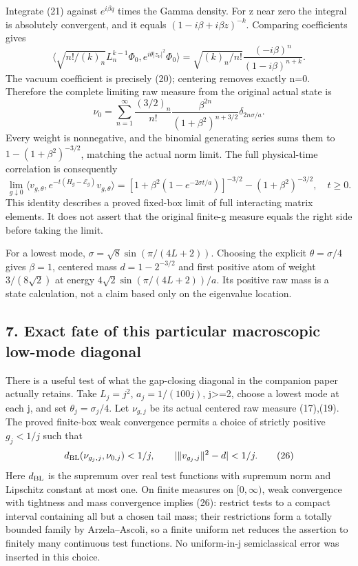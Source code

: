 \documentclass[
  11pt,
]{article}
\begin{document}
Integrate (21) against \(e^{i\beta q}\) times the Gamma density. For z
near zero the integral is absolutely convergent, and it equals
\((1-i\beta+i\beta z)^{-k}\). Comparing coefficients gives \[
 \langle \sqrt{n!/(k)_n}L_n^{k-1}\Phi_0,
                   e^{i\theta|z_\nu|^2}\Phi_0\rangle
  =\sqrt{(k)_n/n!}\frac{(-i\beta)^n}{(1-i\beta)^{n+k}}.
                                                               \tag{23}
\] The vacuum coefficient is precisely (20); centering removes exactly
n=0. Therefore the complete limiting raw measure from the original
actual state is \[
 \boxed{\nu_0=
   \sum_{n=1}^\infty
    \frac{(3/2)_n}{n!}
    \frac{\beta^{2n}}{(1+\beta^2)^{n+3/2}}
          \delta_{2n\sigma/a}.}                         \tag{24}
\] Every weight is nonnegative, and the binomial generating series sums
them to \(1-(1+\beta^2)^{-3/2}\), matching the actual norm limit. The
full physical-time correlation is consequently \[
 \boxed{\lim_{g\downarrow0}
   \langle v_{g,\theta},e^{-t(H_g-\mathcal E_g)}v_{g,\theta}\rangle
 = [1+\beta^2(1-e^{-2\sigma t/a})]^{-3/2}
                   -(1+\beta^2)^{-3/2},\quad t\ge0.}     \tag{25}
\] This identity describes a proved fixed-box limit of full interacting
matrix elements. It does not assert that the original finite-g measure
equals the right side before taking the limit.

For a lowest mode, \(\sigma=\sqrt8\sin(\pi/(4L+2))\). Choosing the
explicit \(\theta=\sigma/4\) gives \(\beta=1\), centered mass
\(d=1-2^{-3/2}\) and first positive atom of weight \(3/(8\sqrt2)\) at
energy \(4\sqrt2\sin(\pi/(4L+2))/a\). Its positive raw mass is a state
calculation, not a claim based only on the eigenvalue location.

\subsection{7. Exact fate of this particular macroscopic low-mode
diagonal}\label{weak-coupling-part-2-exact-fate-of-this-particular-macroscopic-low-mode-diagonal}

There is a useful test of what the gap-closing diagonal in the companion
paper actually retains. Take \(L_j=j^2\), \(a_j=1/(100j)\),
j\textgreater=2, choose a lowest mode at each j, and set
\(\theta_j=\sigma_j/4\). Let \(\nu_{g,j}\) be its actual centered raw
measure (17),(19). The proved finite-box weak convergence permits a
choice of strictly positive \(g_j<1/j\) such that \[
 d_{\rm BL}(\nu_{g_j,j},\nu_{0,j})<1/j,
 \qquad |\|v_{g_j,j}\|^2-d|<1/j.                         \tag{26}
\] Here \(d_{\rm BL}\) is the supremum over real test functions with
supremum norm and Lipschitz constant at most one. On finite measures on
\([0,\infty)\), weak convergence with tightness and mass convergence
implies (26): restrict tests to a compact interval containing all but a
chosen tail mass; their restrictions form a totally bounded family by
Arzela--Ascoli, so a finite uniform net reduces the assertion to
finitely many continuous test functions. No uniform-in-j semiclassical
error was inserted in this choice.
\end{document}
